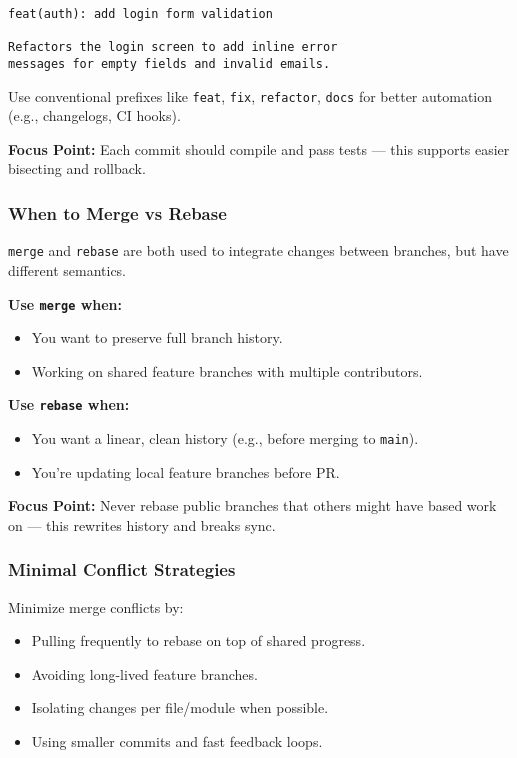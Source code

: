 \documentclass[a4paper,12pt]{article}
\begin{document}
\begin{lstlisting}
feat(auth): add login form validation

Refactors the login screen to add inline error
messages for empty fields and invalid emails.
\end{lstlisting}

Use conventional prefixes like \texttt{feat}, \texttt{fix}, \texttt{refactor}, \texttt{docs} for better automation (e.g., changelogs, CI hooks).

\textbf{Focus Point:} Each commit should compile and pass tests — this supports easier bisecting and rollback.

\subsubsection{When to Merge vs Rebase}

\texttt{merge} and \texttt{rebase} are both used to integrate changes between branches, but have different semantics.

\textbf{Use \texttt{merge} when:}
\begin{itemize}
  \item You want to preserve full branch history.
  \item Working on shared feature branches with multiple contributors.
\end{itemize}

\textbf{Use \texttt{rebase} when:}
\begin{itemize}
  \item You want a linear, clean history (e.g., before merging to \texttt{main}).
  \item You’re updating local feature branches before PR.
\end{itemize}

\textbf{Focus Point:} Never rebase public branches that others might have based work on — this rewrites history and breaks sync.

\subsubsection{Minimal Conflict Strategies}

Minimize merge conflicts by:
\begin{itemize}
  \item Pulling frequently to rebase on top of shared progress.
  \item Avoiding long-lived feature branches.
  \item Isolating changes per file/module when possible.
  \item Using smaller commits and fast feedback loops.
\end{itemize}
\end{document}
